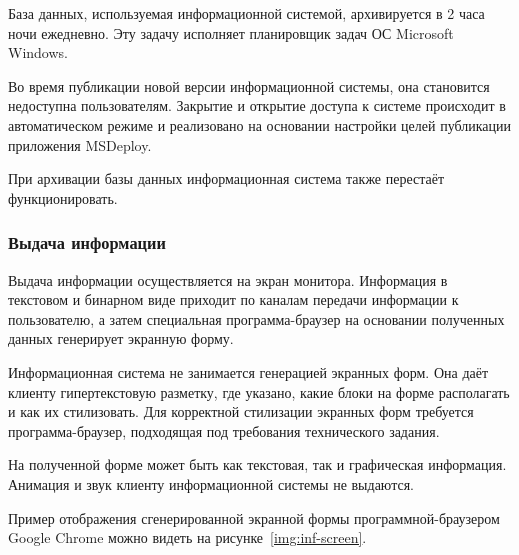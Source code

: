 База данных, используемая информационной системой, архивируется в 2 часа ночи ежедневно.
Эту задачу исполняет планировщик задач ОС Microsoft Windows.

Во время публикации новой версии информационной системы, она становится недоступна пользователям.
Закрытие и открытие доступа к системе происходит в автоматическом режиме и реализовано на основании настройки целей публикации приложения MSDeploy.

При архивации базы данных информационная система также перестаёт функционировать.

\subsubsection{Выдача информации}

Выдача информации осуществляется на экран монитора.
Информация в текстовом и бинарном виде приходит по каналам передачи информации к пользователю, а затем специальная программа-браузер на основании полученных данных генерирует экранную форму.

Информационная система не занимается генерацией экранных форм.
Она даёт клиенту гипертекстовую разметку, где указано, какие блоки на форме располагать и как их стилизовать.
Для корректной стилизации экранных форм требуется программа-браузер, подходящая под требования технического задания.

На полученной форме может быть как текстовая, так и графическая информация. Анимация и звук клиенту информационной системы не выдаются.

Пример отображения сгенерированной экранной формы программной-браузером Google Chrome можно видеть на рисунке~\ref{img:inf-screen}.


\clearpage
\newpage